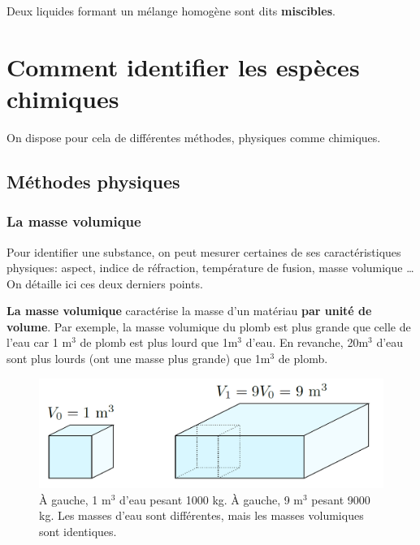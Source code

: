 \documentclass[french, a4paper, 12pt, twocolumn, landscape]{article}
\begin{document}
Deux liquides formant un mélange homogène sont dits \textbf{miscibles}.


\section{Comment identifier les espèces chimiques}

On dispose pour cela de différentes méthodes, physiques comme chimiques.

\subsection{Méthodes physiques}

\subsubsection{La masse volumique}

Pour identifier une substance, on peut mesurer certaines de ses caractéristiques physiques: aspect, indice de réfraction, température de fusion, masse volumique \dots On détaille ici ces deux derniers points.\medskip

\textbf{La masse volumique} caractérise la masse d'un matériau \textbf{par unité de volume}. Par exemple, la masse volumique du plomb est plus grande que celle de l'eau car 1 m$^3$ de plomb est plus lourd que 1m$^3$ d'eau. En revanche, 20m$^3$ d'eau sont plus lourds (ont une masse plus grande) que 1m$^3$ de plomb.

\begin{figure}[ht]
	\centering
	\includegraphics[width=.3\textwidth]{volume.png}
	\caption{À gauche, 1 m$^3$ d’eau pesant 1000 kg. À gauche, 9 m$^3$ pesant 9000 kg. Les masses d’eau sont différentes, mais les masses volumiques sont identiques.}
\end{figure}
\end{document}
